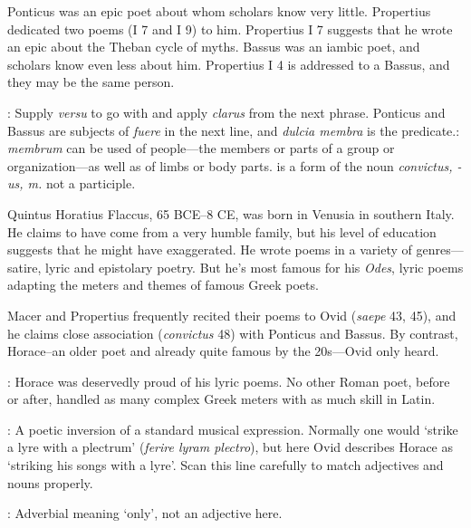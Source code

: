 
Ponticus was an epic poet about whom scholars know very little. Propertius
dedicated two poems (I 7 and I 9) to him.  Propertius I 7 suggests that he
wrote an epic about the Theban cycle of myths.  Bassus was an iambic poet, and
scholars know even less about him.  Propertius I 4 is addressed to a Bassus,
and they may be the same person.

: Supply \textit{versu} to go with and apply
\textit{clarus} from the next phrase. Ponticus and Bassus are subjects of
\textit{fuere} in the next line, and \textit{dulcia membra} is the
predicate.\indent{}: \textit{membrum} can be used of people---the
members or parts of a group or organization---as well as of limbs or body
parts.\indent{} is a form of the noun \textit{convictus, -us, m.}
not a participle.


Quintus Horatius Flaccus, 65 BCE--8 CE, was born in Venusia in southern Italy.
He claims to have come from a very humble family, but his level of education
suggests that he might have exaggerated.  He wrote poems in a variety of
genres---satire, lyric and epistolary poetry.  But he's most famous for his
\textit{Odes}, lyric poems adapting the meters and themes of famous Greek
poets.

Macer and Propertius frequently recited their poems to Ovid (\textit{saepe} 43,
45), and he claims close association (\textit{convictus} 48) with Ponticus and
Bassus.  By contrast, Horace--an older poet and already quite famous by the
20s---Ovid only heard.


: Horace was deservedly proud of his lyric poems.  No other
Roman poet, before or after, handled as many complex Greek meters with as much
skill in Latin.


: A poetic inversion of a standard
musical expression.  Normally one would `strike a lyre with a plectrum'
(\textit{ferire lyram plectro}), but here Ovid describes Horace as `striking
his songs with a lyre'.  Scan this line carefully to match adjectives and nouns
properly.


: Adverbial meaning `only', not an adjective here.


